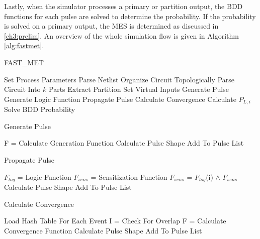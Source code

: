 Lastly, when the simulator processes a primary or partition output, the BDD functions for each pulse are solved to determine the probability. If the probability is solved on a primary output, the MES is determined as discussed in \ref{ch3:prelim}. An overview of the whole simulation flow is given in Algorithm \ref{alg:fastmet}.

\begin{algorithm}
	\caption{FAST\_MET} \label{alg:fastmet}
	\begin{algorithmic} [1]
		\STATE Set Process Parameters
		\STATE Parse Netlist
		\STATE Organize Circuit Topologically
		\STATE Parse Circuit Into $k$ Parts
			\STATE Extract Partition
			\STATE Set Virtual Inputs
				\STATE Generate Pulse
				\STATE Generate Logic Function
				\STATE Propagate Pulse
				\STATE Calculate Convergence
					\STATE Calculate $P_{L,i}$
					\STATE Solve BDD Probability
				\ENDIF
			\ENDFOR
		\ENDFOR		
	\end{algorithmic}
\end{algorithm}

\begin{algorithm}
	\caption{Generate Pulse} 
	\begin{algorithmic} [1]
		\STATE F = Calculate Generation Function
			\STATE Calculate Pulse Shape
			\STATE Add To Pulse List
		\ENDIF		
	\end{algorithmic}
\end{algorithm}

\begin{algorithm}
	\caption{Propagate Pulse} 
	\begin{algorithmic} [1]
			\STATE $F_{log}$ = Logic Function
			\STATE $F_{sens}$ = Sensitization Function
				\STATE $F_{sens}$ = $F_{log}$(i) $\land$ $F_{sens}$
			\ENDFOR		
				\STATE Calculate Pulse Shape
				\STATE Add To Pulse List
			\ENDIF
	\end{algorithmic}
\end{algorithm}

\begin{algorithm}
	\caption{Calculate Convergence} 
	\begin{algorithmic} [1]
		\STATE Load Hash Table For Each Event
			\STATE I = Check For Overlap
				\STATE F = Calculate Convergence Function
					\STATE Calculate Pulse Shape
					\STATE Add To Pulse List
				\ENDIF
			\ENDIF
		\ENDFOR	
	\end{algorithmic}
\end{algorithm}
	
